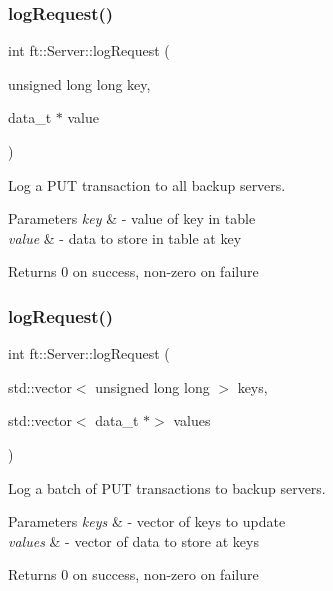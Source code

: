 \subsubsection{\texorpdfstring{log\+Request()}{logRequest()}\hspace{0.1cm}{\footnotesize\ttfamily [1/3]}}
{\footnotesize\ttfamily int ft\+::\+Server\+::log\+Request (\begin{DoxyParamCaption}\item[{unsigned long long}]{key,  }\item[{data\+\_\+t $\ast$}]{value }\end{DoxyParamCaption})}

Log a P\+UT transaction to all backup servers.


\begin{DoxyParams}{Parameters}
{\em key} & -\/ value of key in table \\
\hline
{\em value} & -\/ data to store in table at key\\
\hline
\end{DoxyParams}
\begin{DoxyReturn}{Returns}
0 on success, non-\/zero on failure 
\end{DoxyReturn}
\mbox{\label{classft_1_1Server_ae97719e0790afb356374955130cb4c72}} 
\subsubsection{\texorpdfstring{log\+Request()}{logRequest()}\hspace{0.1cm}{\footnotesize\ttfamily [2/3]}}
{\footnotesize\ttfamily int ft\+::\+Server\+::log\+Request (\begin{DoxyParamCaption}\item[{std\+::vector$<$ unsigned long long $>$}]{keys,  }\item[{std\+::vector$<$ data\+\_\+t $\ast$$>$}]{values }\end{DoxyParamCaption})}

Log a batch of P\+UT transactions to backup servers.


\begin{DoxyParams}{Parameters}
{\em keys} & -\/ vector of keys to update \\
\hline
{\em values} & -\/ vector of data to store at keys\\
\hline
\end{DoxyParams}
\begin{DoxyReturn}{Returns}
0 on success, non-\/zero on failure 
\end{DoxyReturn}
\mbox{\label{classft_1_1Server_ada925516d776a241439217f7c0947c7b}} 
